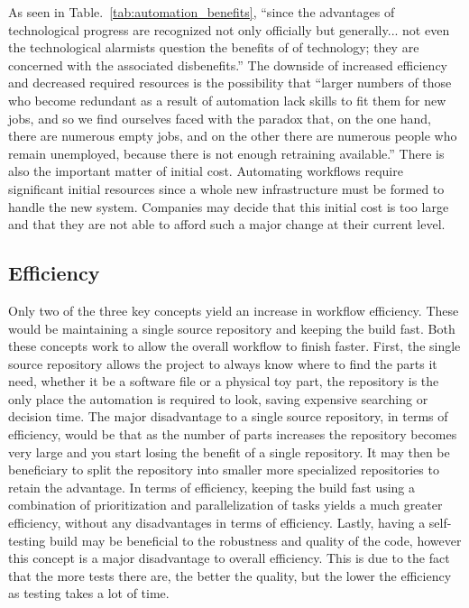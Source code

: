 As seen in Table.~\ref{tab:automation_benefits}, ``since the advantages of technological progress are recognized not only officially but generally... not even the technological alarmists question the benefits of of technology; they are concerned with the associated disbenefits.''\cite{Terborgh} The downside of increased efficiency and decreased required resources is the possibility that ``larger numbers of those who become redundant as a result of automation lack skills to fit them for new jobs, and so we find ourselves faced with the paradox that, on the one hand, there are numerous empty jobs, and on the other there are numerous people who remain unemployed, because there is not enough retraining available.''\cite{Bagrit} There is also the important matter of initial cost. Automating workflows require significant initial resources since a whole new infrastructure must be formed to handle the new system. Companies may decide that this initial cost is too large and that they are not able to afford such a major change at their current level. 

\subsection{Efficiency} %
\label{sub:efficiency}
Only two of the three key concepts yield an increase in workflow efficiency. These would be maintaining a single source repository and keeping the build fast.  Both these concepts work to allow the overall workflow to finish faster.  First, the single source repository allows the project to always know where to find the parts it need, whether it be a software file or a physical toy part, the repository is the only place the automation is required to look, saving expensive searching or decision time. The major disadvantage to a single source repository, in terms of efficiency, would be that as the number of parts increases the repository becomes very large and you start losing the benefit of a single repository. It may then be beneficiary to split the repository into smaller more specialized repositories to retain the advantage. In terms of efficiency, keeping the build fast using a combination of prioritization and parallelization of tasks yields a much greater efficiency, without any disadvantages in terms of efficiency. Lastly, having a self-testing build may be beneficial to the robustness and quality of the code, however this concept is a major disadvantage to overall efficiency. This is due to the fact that the more tests there are, the better the quality, but the lower the efficiency as testing takes a lot of time.

